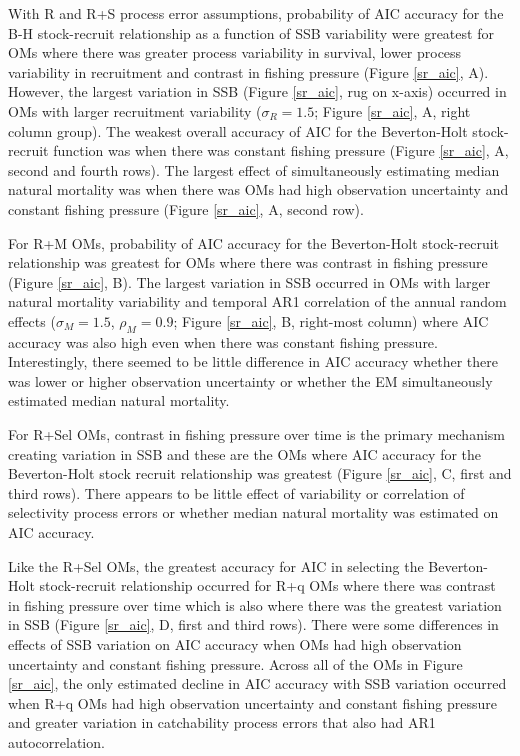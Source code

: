 \documentclass[
  12pt,
]{article}
\begin{document}
With R and R+S process error assumptions, probability of AIC accuracy
for the B-H stock-recruit relationship as a function of SSB variability
were greatest for OMs where there was greater process variability in
survival, lower process variability in recruitment and contrast in
fishing pressure (Figure \ref{sr_aic}, A). However, the largest
variation in SSB (Figure \ref{sr_aic}, rug on x-axis) occurred in OMs
with larger recruitment variability (\(\sigma_R = 1.5\); Figure
\ref{sr_aic}, A, right column group). The weakest overall accuracy of
AIC for the Beverton-Holt stock-recruit function was when there was
constant fishing pressure (Figure \ref{sr_aic}, A, second and fourth
rows). The largest effect of simultaneously estimating median natural
mortality was when there was OMs had high observation uncertainty and
constant fishing pressure (Figure \ref{sr_aic}, A, second row).

For R+M OMs, probability of AIC accuracy for the Beverton-Holt
stock-recruit relationship was greatest for OMs where there was contrast
in fishing pressure (Figure \ref{sr_aic}, B). The largest variation in
SSB occurred in OMs with larger natural mortality variability and
temporal AR1 correlation of the annual random effects
(\(\sigma_M = 1.5\), \(\rho_M = 0.9\); Figure \ref{sr_aic}, B,
right-most column) where AIC accuracy was also high even when there was
constant fishing pressure. Interestingly, there seemed to be little
difference in AIC accuracy whether there was lower or higher observation
uncertainty or whether the EM simultaneously estimated median natural
mortality.

For R+Sel OMs, contrast in fishing pressure over time is the primary
mechanism creating variation in SSB and these are the OMs where AIC
accuracy for the Beverton-Holt stock recruit relationship was greatest
(Figure \ref{sr_aic}, C, first and third rows). There appears to be
little effect of variability or correlation of selectivity process
errors or whether median natural mortality was estimated on AIC
accuracy.

Like the R+Sel OMs, the greatest accuracy for AIC in selecting the
Beverton-Holt stock-recruit relationship occurred for R+q OMs where
there was contrast in fishing pressure over time which is also where
there was the greatest variation in SSB (Figure \ref{sr_aic}, D, first
and third rows). There were some differences in effects of SSB variation
on AIC accuracy when OMs had high observation uncertainty and constant
fishing pressure. Across all of the OMs in Figure \ref{sr_aic}, the only
estimated decline in AIC accuracy with SSB variation occurred when R+q
OMs had high observation uncertainty and constant fishing pressure and
greater variation in catchability process errors that also had AR1
autocorrelation.
\end{document}
